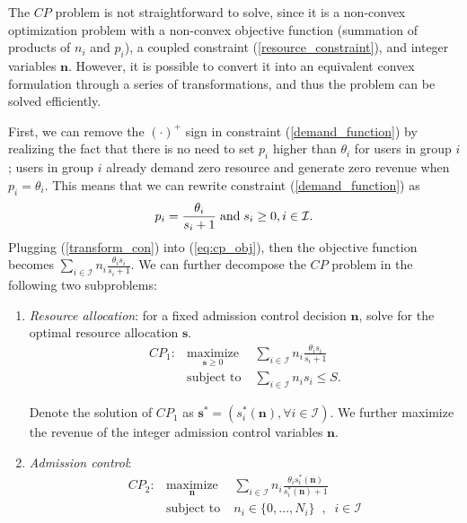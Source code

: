 \documentclass[twocolumn,10pt,twosided]{IEEEtran}
\begin{document}
The $CP$ problem  is not straightforward to solve, since it is a non-convex
optimization problem with a non-convex objective function (summation of
products of $n_{i}$ and $p_{i}$), a coupled constraint
(\ref{resource_constraint}), and integer variables $\boldsymbol{n}$.
However, it is possible to convert it into an equivalent convex
formulation  through a series of transformations, and thus the problem can be solved efficiently.

First, we can remove the $(\cdot)^+$ sign in constraint (\ref{demand_function}) by realizing the fact that there is no need to set $p_i$ higher than $\theta_i$  for users in group
$i$; users in group $i$ already demand zero resource and
generate zero revenue  when $p_i = \theta_i$. This means that we can rewrite constraint
(\ref{demand_function}) as
\begin{equation}
    p_i=\frac{\theta_i}{s_i+1} \;{\rm{and}}\;s_i\ge 0,  i\in\mathcal{I}.
\label{transform_con}
\end{equation}
Plugging (\ref{transform_con}) into (\ref{eq:cp_obj}), then the objective function becomes $\sum\limits_{i\in\mathcal{I}} n_i \frac{\theta_is_i}{s_i+1}$.
We can further decompose the $CP$ problem in the following two subproblems:
\begin{enumerate}
\item \emph{Resource allocation}: for a fixed admission control decision $\boldsymbol{n}$,  solve for the optimal resource allocation $\boldsymbol{s}$.
\begin{eqnarray}
    CP_1:&\underset{\boldsymbol{s}\geq 0}{ \text{maximize}}\;  & \sum\limits_{i\in\mathcal{I}} n_i \frac{\theta_is_i}{s_i+1}\nonumber\\
    &\text{subject to}\;&\sum\limits_{i\in\mathcal{I}} n_i s_{i} \le S. \label{resource_c}
\end{eqnarray}

Denote the solution of $CP_1$ as $\boldsymbol{s}^* =(s_i^*(\boldsymbol{n}),\forall i\in\mathcal{I})$. We further maximize the revenue of the integer admission control variables $\boldsymbol{n}$.
\item \textit{Admission control}:
    \begin{eqnarray}
    CP_2:& \underset{\boldsymbol{n}}{\text{maximize}}\; & \sum\limits_{i\in\mathcal{I}} n_i \frac{\theta_is_i^*(\boldsymbol{n})}{s_i^*(\boldsymbol{n})+1} \label{revenue_function} \\
    &{\text{subject to}}\;& n_i \in\{0,\ldots,N_{i}\} \;\;,\;\;  i\in\mathcal{I} \nonumber
\end{eqnarray}
\end{enumerate}
\end{document}
